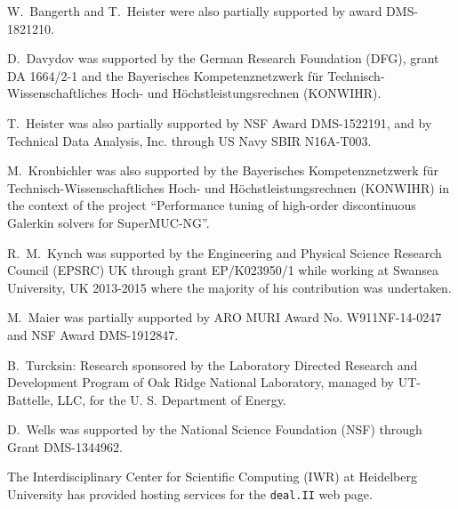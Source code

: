 \documentclass{ansarticle-preprint}
\newcommand{\specialword}[1]{\texttt{#1}}
\newcommand{\dealii}{{\specialword{deal.II}}\xspace}
\begin{document}
W.~Bangerth and T.~Heister were also partially supported by award DMS-1821210.

D.~Davydov was supported by the German Research Foundation (DFG), grant DA
1664/2-1 and the Bayerisches Kompetenznetzwerk
f\"ur Technisch-Wissenschaftliches Hoch- und H\"ochstleistungsrechnen
(KONWIHR).

T.~Heister was also partially supported by NSF Award DMS-1522191, and
by Technical Data Analysis, Inc. through US Navy SBIR N16A-T003.

M.~Kronbichler was also supported by the Bayerisches Kompetenznetzwerk
f\"ur Technisch-Wissen\-schaft\-li\-ches Hoch- und H\"ochstleistungsrechnen
(KONWIHR) in the context of the project
``Performance tuning of high-order discontinuous Galerkin solvers for
SuperMUC-NG''.

R.~M.~Kynch was supported by the Engineering and Physical Science Research
Council (EPSRC) UK through grant EP/K023950/1 while working at Swansea
University, UK 2013-2015 where the majority of his contribution was
undertaken.

M.~Maier was partially supported by ARO MURI Award No. W911NF-14-0247 and
NSF Award DMS-1912847.

B.~Turcksin: Research sponsored by the Laboratory Directed Research and
Development Program of Oak Ridge National Laboratory, managed by UT-Battelle,
LLC, for the U. S. Department of Energy.

D.~Wells was supported by the National Science Foundation (NSF) through Grant
DMS-1344962.

The Interdisciplinary Center for Scientific Computing (IWR) at Heidelberg
University has provided hosting services for the \dealii web page.


{}

\end{document}
